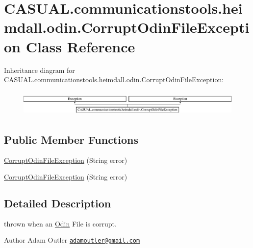 \hypertarget{class_c_a_s_u_a_l_1_1communicationstools_1_1heimdall_1_1odin_1_1_corrupt_odin_file_exception}{\section{C\-A\-S\-U\-A\-L.\-communicationstools.\-heimdall.\-odin.\-Corrupt\-Odin\-File\-Exception Class Reference}
\label{class_c_a_s_u_a_l_1_1communicationstools_1_1heimdall_1_1odin_1_1_corrupt_odin_file_exception}
}
Inheritance diagram for C\-A\-S\-U\-A\-L.\-communicationstools.\-heimdall.\-odin.\-Corrupt\-Odin\-File\-Exception\-:\begin{figure}[H]
\begin{center}
\leavevmode
\includegraphics[height=1.342926cm]{class_c_a_s_u_a_l_1_1communicationstools_1_1heimdall_1_1odin_1_1_corrupt_odin_file_exception}
\end{center}
\end{figure}
\subsection*{Public Member Functions}
\begin{DoxyCompactItemize}
\item 
\hyperlink{class_c_a_s_u_a_l_1_1communicationstools_1_1heimdall_1_1odin_1_1_corrupt_odin_file_exception_abb8a69a738b74846c22e4932b1a28b6b}{Corrupt\-Odin\-File\-Exception} (String error)
\item 
\hyperlink{class_c_a_s_u_a_l_1_1communicationstools_1_1heimdall_1_1odin_1_1_corrupt_odin_file_exception_abb8a69a738b74846c22e4932b1a28b6b}{Corrupt\-Odin\-File\-Exception} (String error)
\end{DoxyCompactItemize}


\subsection{Detailed Description}
thrown when an \hyperlink{class_c_a_s_u_a_l_1_1communicationstools_1_1heimdall_1_1odin_1_1_odin}{Odin} File is corrupt.

\begin{DoxyAuthor}{Author}
Adam Outler \href{mailto:adamoutler@gmail.com}{\tt adamoutler@gmail.\-com} 
\end{DoxyAuthor}


